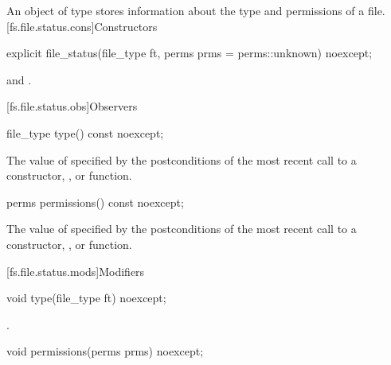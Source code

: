 \pnum
An object of type  stores information about the type
and permissions of a file.
[fs.file.status.cons]{Constructors}

%
\begin{itemdecl}
explicit file_status(file_type ft, perms prms = perms::unknown) noexcept;
\end{itemdecl}

\begin{itemdescr}
\pnum
\ensures
{} and .
\end{itemdescr}

[fs.file.status.obs]{Observers}

%
\begin{itemdecl}
file_type type() const noexcept;
\end{itemdecl}

\begin{itemdescr}
\pnum
\returns
The value of  specified by the postconditions of the most recent call to a constructor,
  , or  function.
\end{itemdescr}

%
\begin{itemdecl}
perms permissions() const noexcept;
\end{itemdecl}

\begin{itemdescr}
\pnum
\returns
The value of  specified by the postconditions of the most recent call to a constructor,
  , or  function.
\end{itemdescr}

[fs.file.status.mods]{Modifiers}

%
\begin{itemdecl}
void type(file_type ft) noexcept;
\end{itemdecl}

\begin{itemdescr}
\pnum
\ensures
{}.
\end{itemdescr}

%
\begin{itemdecl}
void permissions(perms prms) noexcept;
\end{itemdecl}


